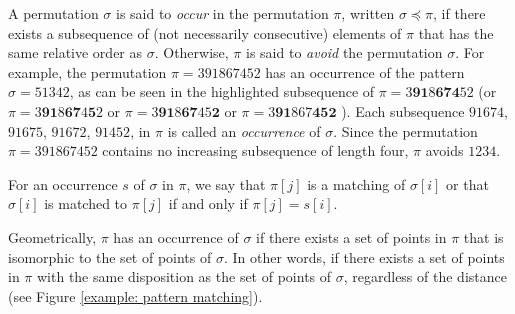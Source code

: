 \documentclass[a4paper]{llncs}
\DeclareMathOperator{\RED}{red}
\begin{document}

A permutation $\sigma$ is said to \emph{occur} in the permutation $\pi$, written $\sigma \preceq \pi$,
if there exists a subsequence of (not necessarily consecutive)
elements of $\pi$ that has the same relative order as $\sigma$.
Otherwise, $\pi$ is said to \emph{avoid} the permutation $\sigma$.
For example, the permutation $\pi = 391867452$
has an occurrence of the pattern $\sigma = 51342$,
as can be seen in the highlighted subsequence of
$\pi = 3\mathbf{9}\mathbf{1}8\mathbf{6}\mathbf{7}\mathbf{4}52$
(or
$\pi = 3\mathbf{9}\mathbf{1}8\mathbf{6}\mathbf{7}4\mathbf{5}2$
or
$\pi = 3\mathbf{9}\mathbf{1}8\mathbf{6}\mathbf{7}45\textbf{2}$
or
$\pi = 3\mathbf{9}\mathbf{1}867\textbf{4}\textbf{5}\mathbf{2}$
).
Each subsequence $91674$,
$91675$,
$91672$,
$91452$,
 in $\pi$ is called an
\emph{occurrence}
of $\sigma$.
Since the permutation $\pi = 391867452$  contains no increasing subsequence of
length four, $\pi$ avoids $1234$.

For an occurrence $s$ of $\sigma$ in $\pi$, 
we say that $\pi[j]$ is a matching of $\sigma[i]$ or 
that $\sigma[i]$ is matched to $\pi[j]$  
if and only if $\pi[j]=s[i]$.

Geometrically, $\pi$ has an occurrence of $\sigma$ if there exists
a set of points in $\pi$ that is isomorphic to the set of points of $\sigma$. 
In other words,
if there exists a set of points in $\pi$ with the same disposition as the set of points of $\sigma$, 
regardless of the distance (see Figure \ref{example: pattern matching}).
\end{document}
